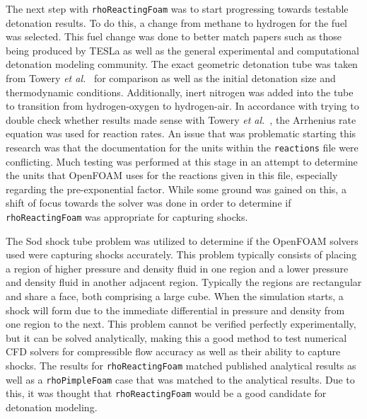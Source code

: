 The next step with \verb|rhoReactingFoam| was to start progressing towards testable detonation results. To do this, a change from methane to hydrogen for the fuel was selected. This fuel change was done to better match papers such as those being produced by TESLa as well as the general experimental and computational detonation modeling community. The exact geometric detonation tube was taken from Towery \textit{et al.}~\cite{towery1} for comparison as well as the initial detonation size and thermodynamic conditions. Additionally, inert nitrogen was added into the tube to transition from hydrogen-oxygen to hydrogen-air. In accordance with trying to double check whether results made sense with Towery \textit{et al.}~\cite{towery1}, the Arrhenius rate equation \cite{arrhenius} was used for reaction rates. An issue that was problematic starting this research was that the documentation for the units within the \verb|reactions| file were conflicting. Much testing was performed at this stage in an attempt to determine the units that OpenFOAM uses for the reactions given in this file, especially regarding the pre-exponential factor. While some ground was gained on this, a shift of focus towards the solver was done in order to determine if \verb|rhoReactingFoam| was appropriate for capturing shocks. 

The Sod shock tube problem was utilized to determine if the OpenFOAM solvers used were capturing shocks accurately. This problem typically consists of placing a region of higher pressure and density fluid in one region and a lower pressure and density fluid in another adjacent region. Typically the regions are rectangular and share a face, both comprising a large cube. When the simulation starts, a shock will form due to the immediate differential in pressure and density from one region to the next. This problem cannot be verified perfectly experimentally, but it can be solved analytically, making this a good method to test numerical CFD solvers for compressible flow accuracy as well as their ability to capture shocks. The results for \verb|rhoReactingFoam| matched published analytical results as well as a \verb|rhoPimpleFoam| case that was matched to the analytical results. Due to this, it was thought that \verb|rhoReactingFoam| would be a good candidate for detonation modeling. 

